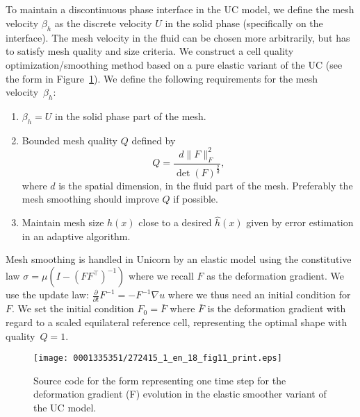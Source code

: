 \subsection{}

To maintain a discontinuous phase interface in the UC model, we define
the mesh velocity $\beta_h$ as the discrete velocity $U$ in the solid
phase (specifically on the interface). The mesh velocity in the fluid
can be chosen more arbitrarily, but has to satisfy mesh quality and
size criteria. We construct a cell quality optimization/smoothing
method based on a pure elastic variant of the UC (see the form in
Figure~\ref{code:FFC_ElasticSmoother}). We define the following
requirements for the mesh velocity~$\beta_h$:
\begin{enumerate}
\item $\beta_h = U$ in the solid phase part of the mesh.
\item Bounded mesh quality $Q$ defined by $$Q = \frac{d \| F
  \|_F^2}{\det(F)^{\frac{2}{d}}},$$ where $d$ is the spatial dimension, in
  the fluid part of the mesh. Preferably the mesh smoothing should
  improve $Q$ if possible.
\item Maintain mesh size $h(x)$ close to a desired $\hat{h}(x)$ given
  by \apost{} error estimation in an adaptive algorithm.
\end{enumerate}
Mesh smoothing is handled in Unicorn by an elastic model using the
constitutive law $\sigma = \mu(I - (FF^\top)^{-1})$ where we recall
$F$ as the deformation gradient. We use the update law:
$\frac{\partial}{\partial t} F^{-1} = -F^{-1} \nabla u$ where we thus
need an initial condition for $F$. We set the initial condition $F_0 =
\bar{F}$ where $\bar{F}$ is the deformation gradient with regard to a
scaled equilateral reference cell, representing the optimal shape with
quality~$Q = 1$.


\begin{figure}[!t]
\bwfig
%
%
%
\texttt{[image: 0001335351/272415\_1\_en\_18\_fig11\_print.eps]}
\caption{Source code for the form representing one time step for the
deformation gradient (F) evolution in the elastic smoother variant of
the UC model.}
\label{code:FFC_ElasticSmoother}
\end{figure}


